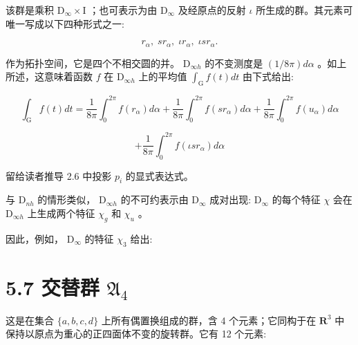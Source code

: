 \documentclass[10pt]{article}
\begin{document}
该群是乘积 \({\mathrm{D}}_{\infty } \times  \mathrm{I}\) ；也可表示为由 \({\mathrm{D}}_{\infty }\) 及经原点的反射 \(\iota\) 所生成的群。其元素可唯一写成以下四种形式之一:

\[
{r}_{\alpha },\;s{r}_{\alpha },\;\iota {r}_{\alpha },\;{\iota s}{r}_{\alpha }.
\]

作为拓扑空间，它是四个不相交圆的并。 \({\mathrm{D}}_{\infty h}\) 的不变测度是 \(\left( {1/{8\pi }}\right) {d\alpha }\) 。如上所述，这意味着函数 \(f\) 在 \({\mathrm{D}}_{\infty h}\) 上的平均值 \({\int }_{\mathrm{G}}f\left( t\right) {dt}\) 由下式给出:

\[
{\int }_{\mathrm{G}}f\left( t\right) {dt} = \frac{1}{8\pi }{\int }_{0}^{2\pi }f\left( {r}_{\alpha }\right) {d\alpha } + \frac{1}{8\pi }{\int }_{0}^{2\pi }f\left( {s{r}_{\alpha }}\right) {d\alpha } + \frac{1}{8\pi }{\int }_{0}^{2\pi }f\left( {u}_{\alpha }\right) {d\alpha }
\]

\[
+ \frac{1}{8\pi }{\int }_{0}^{2\pi }f\left( {{\iota s}{r}_{\alpha }}\right) {d\alpha }
\]

留给读者推导 2.6 中投影 \({p}_{i}\) 的显式表达式。

与 \({\mathrm{D}}_{nh}\) 的情形类似， \({\mathrm{D}}_{\infty h}\) 的不可约表示由 \({\mathrm{D}}_{\infty }\) 成对出现: \({\mathrm{D}}_{\infty }\) 的每个特征 \(\chi\) 会在 \({\mathrm{D}}_{\infty h}\) 上生成两个特征 \({\chi }_{g}\) 和 \({\chi }_{u}\) 。

因此，例如， \({\mathrm{D}}_{\infty }\) 的特征 \({\chi }_{3}\) 给出:

\begin{center}
\end{center}

\section*{5.7 交替群 \({\mathfrak{A}}_{4}\)}

这是在集合 \(\{ a,b,c,d\}\) 上所有偶置换组成的群，含 4 个元素；它同构于在 \({\mathbf{R}}^{3}\) 中保持以原点为重心的正四面体不变的旋转群。它有 12 个元素:
\end{document}
